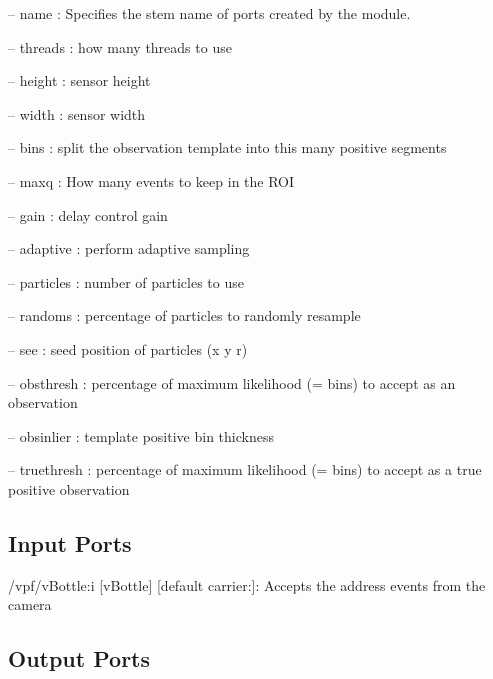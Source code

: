 \begin{DoxyItemize}
\item -- name \+: Specifies the stem name of ports created by the module.
\item -- threads \+: how many threads to use
\item -- height \+: sensor height
\item -- width \+: sensor width
\item -- bins \+: split the observation template into this many positive segments
\item -- maxq \+: How many events to keep in the R\+OI
\item -- gain \+: delay control gain
\item -- adaptive \+: perform adaptive sampling
\item -- particles \+: number of particles to use
\item -- randoms \+: percentage of particles to randomly resample
\item -- see \+: seed position of particles (x y r)
\item -- obsthresh \+: percentage of maximum likelihood (= bins) to accept as an observation
\item -- obsinlier \+: template positive bin thickness
\item -- truethresh \+: percentage of maximum likelihood (= bins) to accept as a true positive observation 
\end{DoxyItemize}\hypertarget{group__zynqGrabber_inputports_sec}{}\subsection{Input Ports}\label{group__zynqGrabber_inputports_sec}

\begin{DoxyItemize}
\item /vpf/v\+Bottle\+:i \mbox{[}v\+Bottle\mbox{]} \mbox{[}default carrier\+:\mbox{]}\+: Accepts the address events from the camera
\end{DoxyItemize}\hypertarget{group__zynqGrabber_outputports_sec}{}\subsection{Output Ports}\label{group__zynqGrabber_outputports_sec}


